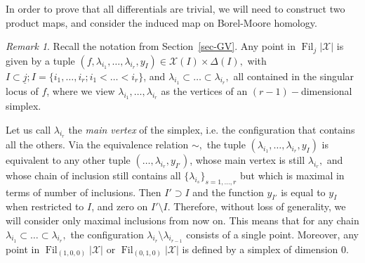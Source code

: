 \documentclass[10pt,a4paper,twoside]{amsart}
\theoremstyle{plain}
\theoremstyle{definition}
\theoremstyle{remark}
\newtheorem{rk}{Remark}[section]
\begin{document}
In order to prove that all differentials are trivial, we will need to construct two product maps, and consider the induced map on Borel-Moore homology.

\begin{rk}\label{rk:simplices}
    Recall the notation from Section~\ref{sec-GV}. Any point in $\operatorname{Fil}_{j}|\mathcal{X}|$ is given by a tuple $(f, \lambda_{i_{1}},\dots,\lambda_{i_r},y_I)\in \mathcal X(I)\times \Delta (I),$ with $I\subset \underline{j};  I=\{i_1,\dots,i_r; i_1<\dots<i_r\}$, and $\lambda_{i_1}\subset\dots\subset\lambda_{i_r},$ all contained in the singular locus of $f$, where we view $\lambda_{i_1},\dots,\lambda_{i_r}$ as the vertices of an $(r-1)-$dimensional simplex.
    
    Let us call $\lambda_{i_r}$ the \emph{main vertex} of the simplex, i.e. the configuration that contains all the others.
    Via the equivalence relation $\sim,$ the tuple $(\lambda_{i_{1}},\dots,\lambda_{i_r},y_I)$ is equivalent to any other tuple $(\dots,\lambda_{i_r},y_{I'})$, whose main vertex is still $\lambda_{i_r},$ and whose chain of inclusion still contains all $\{\lambda_{i_s}\}_{s=1,\dots,r}$ but which is maximal in terms of number of inclusions. Then $I'\supset I$ and the function
$y_{I'}$ is equal to $y_I$ when restricted to $I$, and zero on $I'\setminus I$. Therefore, without loss of generality, we will consider only maximal inclusions from now on.
This means that for any chain $\lambda_{i_1}\subset\dots\subset\lambda_{i_r},$ the configuration $\lambda_{i_r}\setminus\lambda_{i_{r-1}}$ consists of a single point.
Moreover, any point in $\operatorname{Fil}_{{(1,0,0)}}|\mathcal{X}|$ or $\operatorname{Fil}_{{(0,1,0)}}|\mathcal{X}|$ is defined by a simplex of dimension $0.$
\end{rk}
\end{document}
